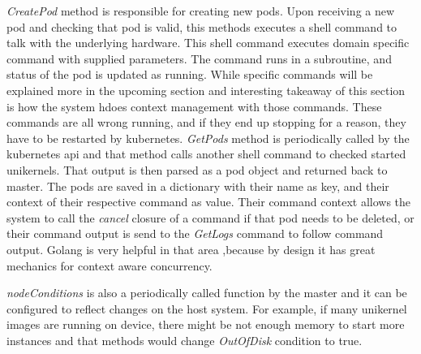 \textit{CreatePod} method is responsible for creating new pods. Upon receiving a new pod and checking that pod is valid, this methods executes a shell command to talk with the underlying hardware. This shell command executes domain specific command with supplied parameters. The command runs in a subroutine, and status of the pod is updated as running. While specific commands will be explained more in the upcoming section and interesting takeaway of this section is how the system hdoes context management with those commands. These commands are all wrong running, and if they end up stopping for a reason, they have to be restarted by kubernetes. \textit{GetPods} method is periodically called by the kubernetes api and that method calls another shell command to checked started unikernels. That output is then parsed as a pod object and returned back to master. The pods are saved in a dictionary with their name as key, and their context of their respective command as value. Their command context allows the system to call the \textit{cancel} closure of a command if that pod needs to be deleted, or their command output is send to the \textit{GetLogs} command to follow command output. Golang is very helpful in that area ,because by design it has great mechanics for context aware concurrency.

\textit{nodeConditions} is also a periodically called function by the master and it can be configured to reflect changes on the host system. For example, if many unikernel images are running on device, there might be not enough memory to start more instances and that methods would change \textit{OutOfDisk} condition to true.